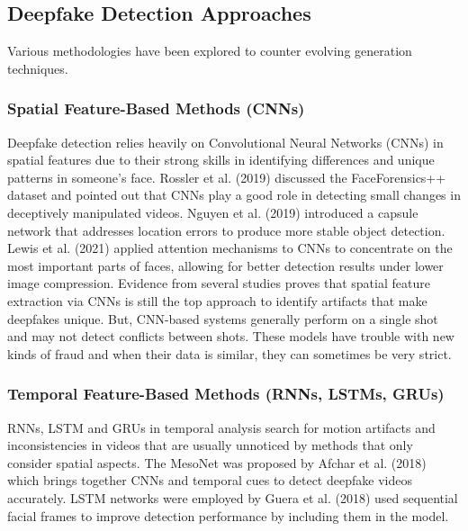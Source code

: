 \documentclass[conference]{IEEEtran}
\begin{document}
\subsection{Deepfake Detection Approaches}
Various methodologies have been explored to counter evolving generation techniques.

\subsubsection{Spatial Feature-Based Methods (CNNs)}
Deepfake detection relies heavily on Convolutional Neural Networks (CNNs) in spatial features due to their strong skills in identifying differences and unique patterns in someone’s face. Rossler et al. (2019) \cite{rossler2019faceforensics} discussed the FaceForensics++ dataset and pointed out that CNNs play a good role in detecting small changes in deceptively manipulated videos. Nguyen et al. (2019) \cite{nguyen2019capsule} introduced a capsule network that addresses location errors to produce more stable object detection. Lewis et al. (2021) \cite{lewis2020deepfake} applied attention mechanisms to CNNs to concentrate on the most important parts of faces, allowing for better detection results under lower image compression. Evidence from several studies proves that spatial feature extraction via CNNs is still the top approach to identify artifacts that make deepfakes unique. But, CNN-based systems generally perform on a single shot and may not detect conflicts between shots. These models have trouble with new kinds of fraud and when their data is similar, they can sometimes be very strict. 

\subsubsection{Temporal Feature-Based Methods (RNNs, LSTMs, GRUs)}
RNNs, LSTM and GRUs in temporal analysis search for motion artifacts and inconsistencies in videos that are usually unnoticed by methods that only consider spatial aspects. The MesoNet was proposed by Afchar et al. (2018) \cite{afchar2018mesonet} which brings together CNNs and temporal cues to detect deepfake videos accurately. LSTM networks were employed by Guera et al. (2018) \cite{guera2018deepfake} used sequential facial frames to improve detection performance by including them in the model.
\end{document}
